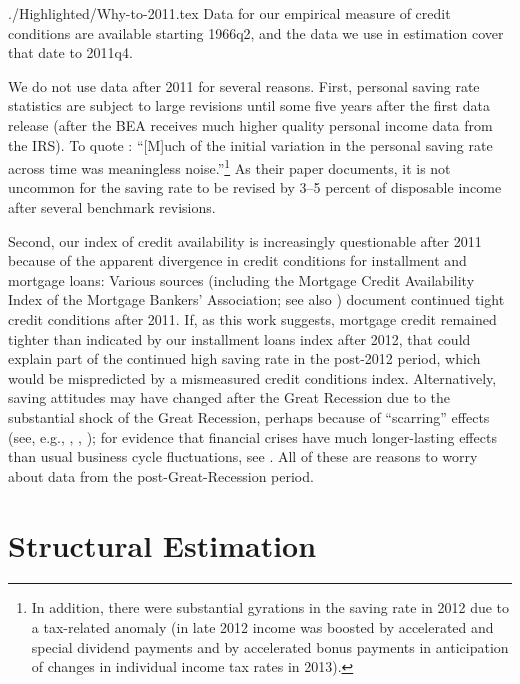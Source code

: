 \documentclass[titlepage]{\econtex}
\begin{document}
\hypertarget{Why-to-2011}{}
\begin{verbatimwrite}{./Highlighted/Why-to-2011.tex}
Data for our empirical measure of credit conditions are available starting 1966q2, and the data we use in estimation cover that date to 2011q4.

We do not use data after 2011 for several reasons. First, personal saving rate statistics are subject to large revisions until some five years  after the first data release (after the BEA receives much higher quality personal income data from the IRS).  To quote \cite{nsSavingRevisions}: ``[M]uch of the initial variation in the personal saving rate across time was meaningless noise.''\footnote{In addition, there were substantial gyrations in the saving rate in 2012 due to a tax-related anomaly (in late 2012 income was boosted by accelerated and special dividend payments and by accelerated bonus payments in anticipation of changes in individual income tax rates in 2013).} As  their paper documents, it is not uncommon for the saving rate to be revised by 3--5 percent of disposable income after several benchmark revisions.


Second, our index of credit availability is increasingly questionable after 2011 because of the apparent divergence in credit conditions for installment and mortgage loans: Various sources (including the Mortgage Credit Availability Index of the Mortgage Bankers' Association; see also \cite{bhutta_mortgageDebt}) document continued tight credit conditions after 2011.  If, as this work suggests, mortgage credit remained tighter than indicated by our installment loans index after 2012, that could explain part of the continued high saving rate in the post-2012 period, which would be mispredicted by a mismeasured credit conditions index.  Alternatively, saving attitudes may have changed after the Great Recession due to the substantial shock of the Great Recession, perhaps because of ``scarring'' effects  (see, e.g., \cite{malmendierSheng}, \cite{jstLeveragedBubbles}, \cite{hallQuantifying}); for evidence that financial crises have much longer-lasting effects than usual business cycle fluctuations, see \cite{rrAftermath}.  All of these are reasons to worry about data from the post-Great-Recession period.
\end{verbatimwrite}


\section{Structural Estimation} \label{sStructuralEstimation}
\end{document}
